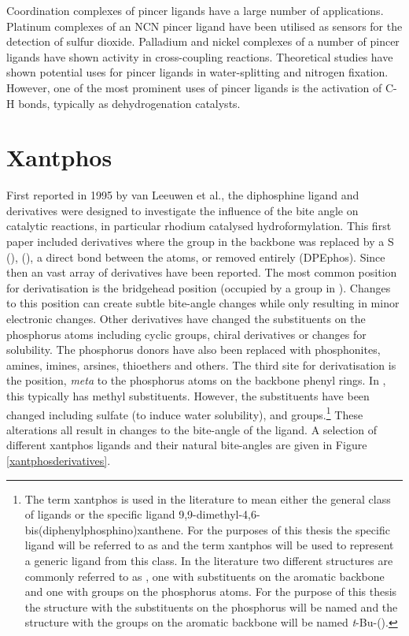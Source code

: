 Coordination complexes of pincer ligands have a large number of applications.  Platinum complexes of an NCN pincer ligand have been utilised as sensors for the detection of sulfur dioxide.\cite{Albrecht2000, Albrecht2000c, Albrecht2001}  Palladium and nickel complexes of a number of pincer ligands have shown activity in cross-coupling reactions.\cite{Hahn2007, Bedford2000, Kimura2006, Zim2000, Obora2006} Theoretical studies have shown potential uses for pincer ligands in water-splitting\cite{Sandhya2011} and nitrogen fixation.\cite{Holscher2007}  However, one of the most prominent uses of pincer ligands is the activation of C-H bonds, typically as dehydrogenation catalysts.\cite{Choi2011, Albrecht2001, Crabtree2001}

\section{Xantphos}

First reported in 1995 by van Leeuwen et al.,\cite{Kranenburg1995} the diphosphine ligand \Phxantphos{} and derivatives were designed to investigate the influence of the bite angle on catalytic reactions, in particular rhodium catalysed hydroformylation.  This first paper included derivatives where the  group in the backbone was replaced by a S (\Phthixantphos),  (\Phsixantphos), a direct bond between the atoms, or removed entirely (DPEphos).  Since then an vast array of derivatives have been reported.  The most common position for derivatisation is the bridgehead position (occupied by a  group in \Phxantphos{}).  Changes to this position can create subtle bite-angle changes while only resulting in minor electronic changes. Other derivatives have changed the substituents on the phosphorus atoms including cyclic groups, chiral derivatives or changes for solubility.  The phosphorus donors have also been replaced with phosphonites, amines, imines, arsines, thioethers and others.  The third site for derivatisation is the position, \emph{meta} to the phosphorus atoms on the backbone phenyl rings.  In \Phthixantphos, this typically has methyl substituents.  However, the substituents have been changed including sulfate (to induce water solubility), and \tBu{} groups.\footnote{The term xantphos is used in the literature to mean either the general class of ligands or the specific ligand 9,9-dimethyl-4,6-bis(diphenylphosphino)xanthene.  For the purposes of this thesis the specific ligand will be referred to as \Phxantphos{} and the term xantphos will be used to represent a generic ligand from this class.  In the literature two different structures are commonly referred to as  \tBuxantphos{}, one with \tBu{} substituents on the aromatic backbone and one with \tBu{} groups on the phosphorus atoms.  For the purpose of this thesis the structure with the \tBu{} substituents on the phosphorus will be named \tBuxantphos{} and the structure with the \tBu{} groups on the aromatic backbone will be named \emph{t}-Bu-(\Phxantphos).}  These alterations all result in changes to the bite-angle of the ligand.  A selection of different xantphos ligands and their natural bite-angles are given in Figure \ref{xantphosderivatives}.

